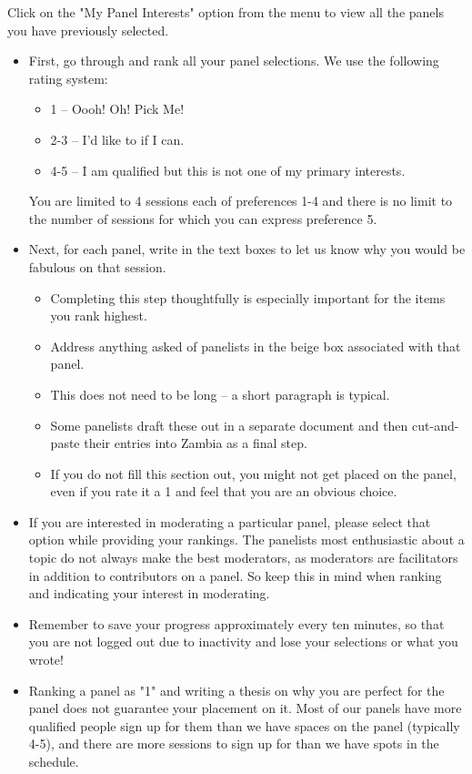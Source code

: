 \documentclass[captions=tablesignature]{scrartcl}
\begin{document}
Click on the "My Panel Interests" option from the menu to view all
the panels you have previously selected.
\begin{itemize}
\item First, go through and rank all your panel selections. We use the
following rating system:
\begin{itemize}
\item 1 -- Oooh! Oh! Pick Me!
\item 2-3 -- I'd like to if I can.
\item 4-5 -- I am qualified but this is not one of my primary
interests.
\end{itemize}
You are limited to 4 sessions each of preferences 1-4 and there is
no limit to the number of sessions for which you can express
preference 5.
\item Next, for each panel, write in the text boxes to let us know
why you would be fabulous on that session.
\begin{itemize}
\item Completing this step thoughtfully is especially important for
the items you rank highest.
\item Address anything asked of panelists in the beige box associated
with that panel.
\item This does not need to be long -- a short paragraph is typical.
\item Some panelists draft these out in a separate document and then
cut-and-paste their entries into Zambia as a final step.
\item If you do not fill this section out, you might not get placed on
the panel, even if you rate it a 1 and feel that you are an
obvious choice.
\end{itemize}
\item If you are interested in moderating a particular panel, please
select that option while providing your rankings.  The panelists
most enthusiastic about a topic do not always make the best
moderators, as moderators are facilitators in addition to
contributors on a panel. So keep this in mind when ranking and
indicating your interest in moderating.
\item Remember to save your progress approximately every ten minutes, so
that you are not logged out due to inactivity and lose your
selections or what you wrote!
\item Ranking a panel as "1" and writing a thesis on why you are perfect
for the panel does not guarantee your placement on it. Most of our
panels have more qualified people sign up for them than we have
spaces on the panel (typically 4-5), and there are more sessions
to sign up for than we have spots in the schedule.
\end{itemize}
\end{document}
